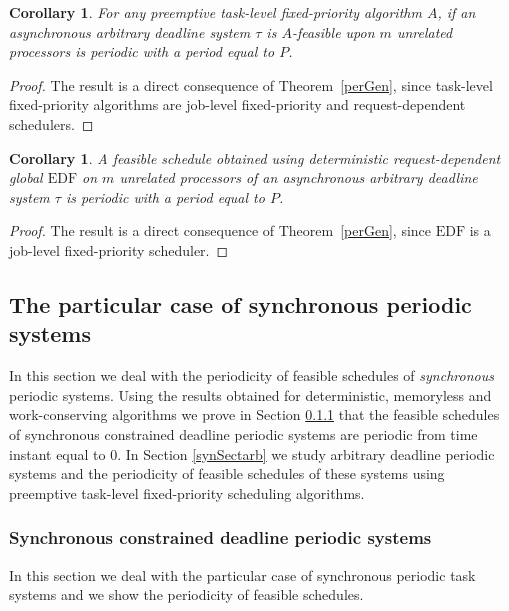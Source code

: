 \documentclass[a4paper,11pt]{article}
\newcommand{\EDF}{\textrm{EDF}}
\newtheorem{Corollary}[Theorem]{Corollary}
\begin{document}
\begin{Corollary}\label{task-levelperiod}
For any preemptive task-level fixed-priority algorithm $A$, if an asynchronous arbitrary deadline system $\tau$ is $A$-feasible upon $m$ unrelated processors is periodic with a period equal to $P$.
\end{Corollary}

\begin{proof}
The result is a direct consequence of Theorem~\ref{perGen}, since task-level fixed-priority algorithms are job-level fixed-priority and request-dependent schedulers.
\end{proof}

\begin{Corollary}\label{edfAll1} A feasible schedule obtained using
  deterministic request-dependent global {$\EDF$} on $m$ unrelated processors of an
  asynchronous arbitrary deadline system $\tau$ is periodic with a
  period equal to $P$. 
\end{Corollary}

\begin{proof}
  The result is a direct consequence of Theorem~\ref{perGen}, since
  {$\EDF$} is a job-level fixed-priority scheduler.
\end{proof}

\subsection{The particular case of synchronous periodic systems}
\label{SectSynchEns}

In this section we deal with the periodicity of feasible schedules of
\emph{synchronous} periodic systems. Using the results obtained for
deterministic, memoryless and work-conserving algorithms we prove in
Section \ref{synSect} that the feasible schedules of synchronous
constrained deadline periodic systems are periodic from time instant
equal to $0$. In Section \ref{synSectarb} we study arbitrary deadline
periodic systems and the periodicity of feasible schedules of these
systems using preemptive task-level fixed-priority scheduling
algorithms.

\subsubsection{Synchronous constrained deadline periodic
  systems} \label{synSect} 

In this section we deal with the particular case of synchronous
periodic task systems and we show the periodicity of feasible
schedules.
\end{document}
